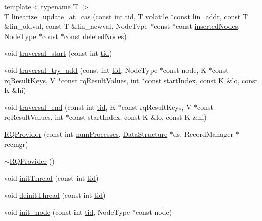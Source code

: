 \begin{DoxyCompactItemize}
\item 
{\footnotesize template$<$typename T $>$ }\\T \hyperlink{classRQProvider_a234b9ee35646cdff3d751df16424a57e}{linearize\+\_\+update\+\_\+at\+\_\+cas} (const int \hyperlink{microbench_2main_8cpp_a9ca9869868fe7e7a38a921cc7de4103f}{tid}, T volatile $\ast$const lin\+\_\+addr, const T \&lin\+\_\+oldval, const T \&lin\+\_\+newval, Node\+Type $\ast$const $\ast$const \hyperlink{scxrecord_8h_a0f26579d4b35e2dad20ee190a7986d08}{inserted\+Nodes}, Node\+Type $\ast$const $\ast$const \hyperlink{scxrecord_8h_ae536bce1bb8c0fffd7a3053f7d258f1e}{deleted\+Nodes})
\item 
void \hyperlink{classRQProvider_a96fe481c7ba6b30efbd90ac1eca1e788}{traversal\+\_\+start} (const int \hyperlink{microbench_2main_8cpp_a9ca9869868fe7e7a38a921cc7de4103f}{tid})
\item 
void \hyperlink{classRQProvider_ae67024f11a58a4a3e4a6cb86b7ed8292}{traversal\+\_\+try\+\_\+add} (const int \hyperlink{microbench_2main_8cpp_a9ca9869868fe7e7a38a921cc7de4103f}{tid}, Node\+Type $\ast$const node, K $\ast$const rq\+Result\+Keys, V $\ast$const rq\+Result\+Values, int $\ast$const start\+Index, const K \&lo, const K \&hi)
\item 
void \hyperlink{classRQProvider_ad4bbd6a7d5ea8f497a49ba3bbd03f7fc}{traversal\+\_\+end} (const int \hyperlink{microbench_2main_8cpp_a9ca9869868fe7e7a38a921cc7de4103f}{tid}, K $\ast$const rq\+Result\+Keys, V $\ast$const rq\+Result\+Values, int $\ast$const start\+Index, const K \&lo, const K \&hi)
\item 
\hyperlink{classRQProvider_a657b85f70daa72353de19671d40bbc22}{R\+Q\+Provider} (const int \hyperlink{testing_8cpp_aa085812188e21ede75351d88b9b2c30d}{num\+Processes}, \hyperlink{classDataStructure}{Data\+Structure} $\ast$ds, Record\+Manager $\ast$recmgr)
\item 
\hyperlink{classRQProvider_aefeec3df4b02ba85843f8dddd0230df8}{$\sim$\+R\+Q\+Provider} ()
\item 
void \hyperlink{classRQProvider_a3485da4cb5f94a1229cd31578b088f85}{init\+Thread} (const int \hyperlink{microbench_2main_8cpp_a9ca9869868fe7e7a38a921cc7de4103f}{tid})
\item 
void \hyperlink{classRQProvider_a3f20b96dfa5a47d9f59ada98e3322695}{deinit\+Thread} (const int \hyperlink{microbench_2main_8cpp_a9ca9869868fe7e7a38a921cc7de4103f}{tid})
\item 
void \hyperlink{classRQProvider_a2cd517d996a170c029435b638c9cf219}{init\+\_\+node} (const int \hyperlink{microbench_2main_8cpp_a9ca9869868fe7e7a38a921cc7de4103f}{tid}, Node\+Type $\ast$const node)

\end{DoxyCompactItemize}
